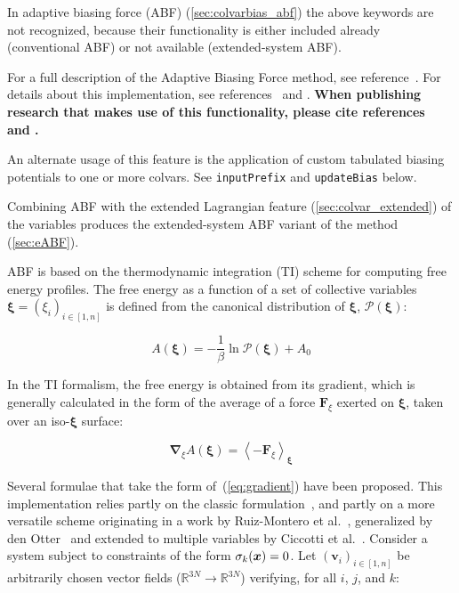 In adaptive biasing force (ABF) (\ref{sec:colvarbias_abf}) the above keywords are not recognized, because their functionality is either included already (conventional ABF) or not available (extended-system ABF).




For a full description of the Adaptive Biasing Force method, see
reference~\cite{Darve2008}. For details about this implementation,
see references~\cite{Henin2004} and \cite{Henin2010}. \textbf{When
publishing research that makes use of this functionality, please cite
references~\cite{Darve2008} and \cite{Henin2010}.}

An alternate usage of this feature is the application of custom
tabulated biasing potentials to one or more colvars. See
\texttt{inputPrefix} and \texttt{updateBias} below.

Combining ABF with the extended Lagrangian feature (\ref{sec:colvar_extended})
of the variables produces the extended-system ABF variant of the method
(\ref{sec:eABF}).

ABF is based on the thermodynamic integration (TI) scheme for
computing free energy profiles. The free energy as a function
of a set of collective variables $\bm{\xi}=(\xi_{i})_{i\in[1,n]}$
is defined from the canonical distribution of $\bm{\xi}$, ${\mathcal P}(\bm{\xi})$:

\begin{equation}
  \label{eq:free}
  A(\bm{\xi}) = -\frac{1}{\beta} \ln {\mathcal P}(\bm{\xi}) + A_0
\end{equation}

In the TI formalism, the free energy is obtained from its gradient,
which is generally calculated in the form of the average of a force
$\bm{F}_\xi$ exerted on $\bm{\xi}$, taken over an iso-$\bm{\xi}$ surface:

\begin{equation}
  \label{eq:gradient}
  \bm{\nabla}_\xi A(\bm{\xi}) = \left\langle -\bm{F}_\xi \right\rangle_{\bm{\xi}}
\end{equation}

Several formulae that take the form of~(\ref{eq:gradient}) have been
proposed.  This implementation relies partly on the classic
formulation~\cite{Carter1989}, and partly on a more versatile scheme
originating in a work by Ruiz-Montero et al.~\cite{Ruiz-Montero1997},
generalized by den Otter~\cite{denOtter2000} and extended to multiple
variables by Ciccotti et al.~\cite{Ciccotti2005}.  Consider a system
subject to constraints of the form $\sigma_{k}({\mbox{\boldmath{$x$}}}) = 0$.  Let
$(\bm{v}_{i})_{i\in[1,n]}$ be arbitrarily chosen vector fields
($\mathbb{R}^{3N}\rightarrow\mathbb{R}^{3N}$) verifying, for all $i$,
$j$, and $k$:

